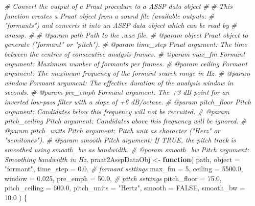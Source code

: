 \documentclass[
]{book}
\newenvironment{Shaded}{\begin{snugshade}}{\end{snugshade}}
\newcommand{\AttributeTok}[1]{\textcolor[rgb]{0.77,0.63,0.00}{#1}}
\newcommand{\CommentTok}[1]{\textcolor[rgb]{0.56,0.35,0.01}{\textit{#1}}}
\newcommand{\ConstantTok}[1]{\textcolor[rgb]{0.00,0.00,0.00}{#1}}
\newcommand{\ControlFlowTok}[1]{\textcolor[rgb]{0.13,0.29,0.53}{\textbf{#1}}}
\newcommand{\DecValTok}[1]{\textcolor[rgb]{0.00,0.00,0.81}{#1}}
\newcommand{\FloatTok}[1]{\textcolor[rgb]{0.00,0.00,0.81}{#1}}
\newcommand{\NormalTok}[1]{#1}
\newcommand{\OtherTok}[1]{\textcolor[rgb]{0.56,0.35,0.01}{#1}}
\newcommand{\StringTok}[1]{\textcolor[rgb]{0.31,0.60,0.02}{#1}}
\begin{document}
\begin{Shaded}
\begin{Highlighting}[]
\CommentTok{\#\textquotesingle{} Convert the output of a Praat procedure to a ASSP data object}
\CommentTok{\#\textquotesingle{}}
\CommentTok{\#\textquotesingle{} This function creates a Praat object from a sound file (available outputs:}
\CommentTok{\#\textquotesingle{} "formants") and converts it into an ASSP data object which can be read by}
\CommentTok{\#\textquotesingle{} wrassp.}
\CommentTok{\#\textquotesingle{}}
\CommentTok{\#\textquotesingle{} @param path Path to the .wav file.}
\CommentTok{\#\textquotesingle{} @param object Praat object to generate (\textasciigrave{}"formant"\textasciigrave{} or \textasciigrave{}"pitch"\textasciigrave{}).}
\CommentTok{\#\textquotesingle{} @param time\_step Praat argument: The time between the centres of consecutive analysis frames.}
\CommentTok{\#\textquotesingle{} @param max\_fm Formant argument: Maximum number of formants per frames.}
\CommentTok{\#\textquotesingle{} @param ceiling Formant argument: The maximum frequency of the formant search range in Hz.}
\CommentTok{\#\textquotesingle{} @param window Formant argument: The effective duration of the analysis window in seconds.}
\CommentTok{\#\textquotesingle{} @param pre\_emph Formant argument: The +3 dB point for an inverted low{-}pass filter with a slope of +6 dB/octave.}
\CommentTok{\#\textquotesingle{} @param pitch\_floor Pitch argument: Candidates below this frequency will not be recruited.}
\CommentTok{\#\textquotesingle{} @param pitch\_ceiling Pitch argument: Candidates above this frequency will be ignored.}
\CommentTok{\#\textquotesingle{} @param pitch\_units Pitch argument: Pitch unit as character (\textasciigrave{}"Herz"\textasciigrave{} or \textasciigrave{}"semitones"\textasciigrave{}).}
\CommentTok{\#\textquotesingle{} @param smooth Pitch argument: If \textasciigrave{}TRUE\textasciigrave{}, the pitch track is smoothed using \textasciigrave{}smooth\_bw\textasciigrave{} as bandwidth.}
\CommentTok{\#\textquotesingle{} @param smooth\_bw Pitch argument: Smoothing bandwidth in Hz.}
\NormalTok{praat2AsspDataObj }\OtherTok{\textless{}{-}} \ControlFlowTok{function}\NormalTok{(}
\NormalTok{  path,}
  \AttributeTok{object =} \StringTok{"formant"}\NormalTok{,}
  \AttributeTok{time\_step =} \FloatTok{0.0}\NormalTok{,}
  \CommentTok{\# formant settings}
  \AttributeTok{max\_fm =} \DecValTok{5}\NormalTok{,}
  \AttributeTok{ceiling =} \FloatTok{5500.0}\NormalTok{,}
  \AttributeTok{window =} \FloatTok{0.025}\NormalTok{,}
  \AttributeTok{pre\_emph =} \FloatTok{50.0}\NormalTok{,}
  \CommentTok{\# pitch settings}
  \AttributeTok{pitch\_floor =} \FloatTok{75.0}\NormalTok{,}
  \AttributeTok{pitch\_ceiling =} \FloatTok{600.0}\NormalTok{,}
  \AttributeTok{pitch\_units =} \StringTok{"Hertz"}\NormalTok{,}
  \AttributeTok{smooth =} \ConstantTok{FALSE}\NormalTok{,}
  \AttributeTok{smooth\_bw =} \FloatTok{10.0}
\NormalTok{) \{}


\end{Highlighting}
\end{Shaded}
\end{document}
